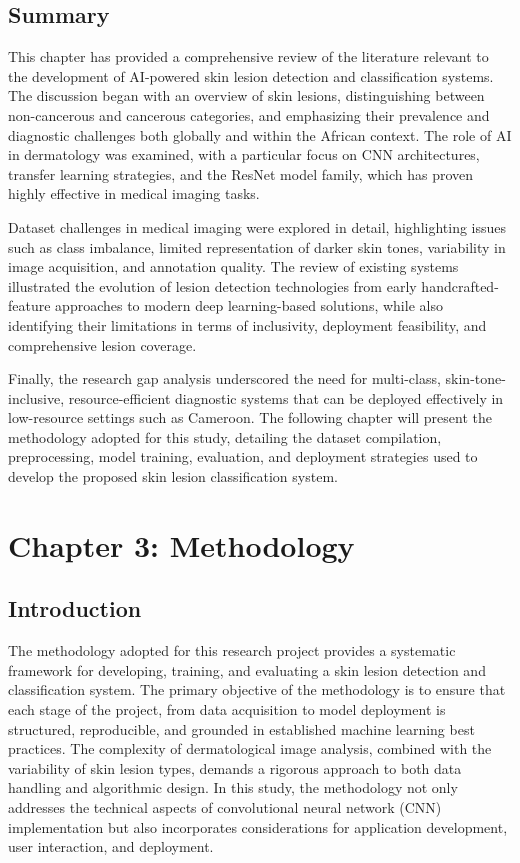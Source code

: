 \documentclass[
  12pt,
  oneside]{article}
\begin{document}
\subsection{Summary}\label{summary}

This chapter has provided a comprehensive review of the literature
relevant to the development of AI-powered skin lesion detection and
classification systems. The discussion began with an overview of skin
lesions, distinguishing between non-cancerous and cancerous categories,
and emphasizing their prevalence and diagnostic challenges both globally
and within the African context. The role of AI in dermatology was
examined, with a particular focus on CNN architectures, transfer
learning strategies, and the ResNet model family, which has proven
highly effective in medical imaging tasks.

Dataset challenges in medical imaging were explored in detail,
highlighting issues such as class imbalance, limited representation of
darker skin tones, variability in image acquisition, and annotation
quality. The review of existing systems illustrated the evolution of
lesion detection technologies from early handcrafted-feature approaches
to modern deep learning-based solutions, while also identifying their
limitations in terms of inclusivity, deployment feasibility, and
comprehensive lesion coverage.

Finally, the research gap analysis underscored the need for multi-class,
skin-tone-inclusive, resource-efficient diagnostic systems that can be
deployed effectively in low-resource settings such as Cameroon. The
following chapter will present the methodology adopted for this study,
detailing the dataset compilation, preprocessing, model training,
evaluation, and deployment strategies used to develop the proposed skin
lesion classification system.

\newpage

\section{Chapter 3: Methodology}\label{chapter-3-methodology}

\subsection{Introduction}\label{introduction-2}

The methodology adopted for this research project provides a systematic
framework for developing, training, and evaluating a skin lesion
detection and classification system. The primary objective of the
methodology is to ensure that each stage of the project, from data
acquisition to model deployment is structured, reproducible, and
grounded in established machine learning best practices. The complexity
of dermatological image analysis, combined with the variability of skin
lesion types, demands a rigorous approach to both data handling and
algorithmic design. In this study, the methodology not only addresses
the technical aspects of convolutional neural network (CNN)
implementation but also incorporates considerations for application
development, user interaction, and deployment.
\end{document}
